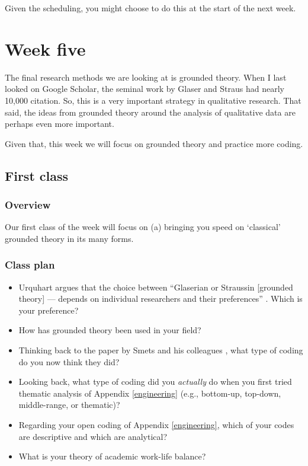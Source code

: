 \documentclass[]{book}
\theoremstyle{definition}
\theoremstyle{definition}
\theoremstyle{definition}
\theoremstyle{remark}
\begin{document}
Given the scheduling, you might choose to do this at the start of the
next week.

\hypertarget{w5-details}{%
\chapter{Week five}\label{w5-details}}

The final research methods we are looking at is grounded theory. When I
last looked on Google Scholar, the seminal work by Glaser and Straus
\autocite*{glaser_1967_discoverygroundedtheory} had nearly 10,000
citation. So, this is a very important strategy in qualitative research.
That said, the ideas from grounded theory around the analysis of
qualitative data are perhaps even more important.

Given that, this week we will focus on grounded theory and practice more
coding.

\hypertarget{first-class-4}{%
\section*{First class}\label{first-class-4}}

\hypertarget{overview-8}{%
\subsection*{Overview}\label{overview-8}}

Our first class of the week will focus on (a) bringing you speed on
`classical' grounded theory in its many forms.

\hypertarget{class-plan-8}{%
\subsection*{Class plan}\label{class-plan-8}}

\begin{itemize}
\item
  Urquhart argues that the choice between ``Glaserian or Straussin
  {[}grounded theory{]} --- depends on individual researchers and their
  preferences'' \autocite{urquhart_2017_groundedtheoryqualitative}.
  Which is your preference?
\item
  How has grounded theory been used in your field?
\item
  Thinking back to the paper by Smets and his colleagues
  \autocite{smets_2015_reinsurancetradinglloyd}, what type of coding do
  you now think they did?
\item
  Looking back, what type of coding did you \emph{actually} do when you
  first tried thematic analysis of Appendix \ref{engineering} (e.g.,
  bottom-up, top-down, middle-range, or thematic)?
\item
  Regarding your open coding of Appendix \ref{engineering}, which of
  your codes are descriptive and which are analytical?
\item
  What is your theory of academic work-life balance?
\end{itemize}
\end{document}
